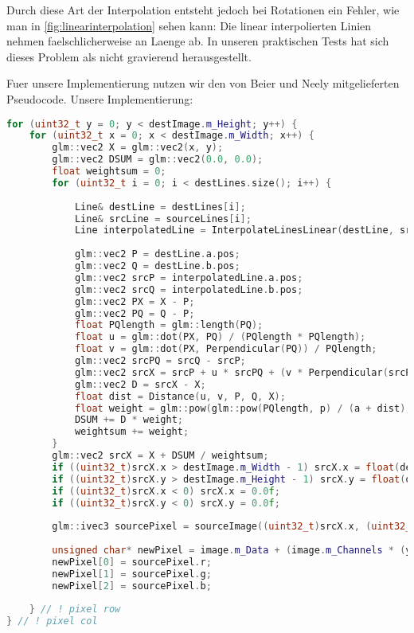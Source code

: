 
Durch diese Art der Interpolation entsteht jedoch bei
Rotationen ein Fehler, wie man in \ref{fig:linearinterpolation} sehen kann: Die linear
interpolierten Linien nehmen faelschlicherweise
an Laenge ab. In unseren praktischen Tests hat sich
dieses Problem als nicht gravierend herausgestellt.

Fuer unsere Implementierung nutzen wir den von Beier und Neely
mitgelieferten Pseudocode. Unsere Implementierung:

\begin{lstlisting}[language=C++, caption=Beier-Neely in C++, label=bncode, xleftmargin=0.5cm]
for (uint32_t y = 0; y < destImage.m_Height; y++) {
	for (uint32_t x = 0; x < destImage.m_Width; x++) {
		glm::vec2 X = glm::vec2(x, y);
		glm::vec2 DSUM = glm::vec2(0.0, 0.0);
		float weightsum = 0;     
		for (uint32_t i = 0; i < destLines.size(); i++) {
			
			Line& destLine = destLines[i];
			Line& srcLine = sourceLines[i];
			Line interpolatedLine = InterpolateLinesLinear(destLine, srcLine, pct);
			
			glm::vec2 P = destLine.a.pos;
			glm::vec2 Q = destLine.b.pos;
			glm::vec2 srcP = interpolatedLine.a.pos;
			glm::vec2 srcQ = interpolatedLine.b.pos;
			glm::vec2 PX = X - P;
			glm::vec2 PQ = Q - P;
			float PQlength = glm::length(PQ);
			float u = glm::dot(PX, PQ) / (PQlength * PQlength);
			float v = glm::dot(PX, Perpendicular(PQ)) / PQlength;
			glm::vec2 srcPQ = srcQ - srcP;
			glm::vec2 srcX = srcP + u * srcPQ + (v * Perpendicular(srcPQ) / glm::length(srcPQ));
			glm::vec2 D = srcX - X;
			float dist = Distance(u, v, P, Q, X);
			float weight = glm::pow(glm::pow(PQlength, p) / (a + dist), b);
			DSUM += D * weight;
			weightsum += weight;        
		}                
		glm::vec2 srcX = X + DSUM / weightsum;
		if ((uint32_t)srcX.x > destImage.m_Width - 1) srcX.x = float(destImage.m_Width - 1);
		if ((uint32_t)srcX.y > destImage.m_Height - 1) srcX.y = float(destImage.m_Height - 1);
		if ((uint32_t)srcX.x < 0) srcX.x = 0.0f;
		if ((uint32_t)srcX.y < 0) srcX.y = 0.0f;                
		
		glm::ivec3 sourcePixel = sourceImage((uint32_t)srcX.x, (uint32_t)srcX.y);                
		
		unsigned char* newPixel = image.m_Data + (image.m_Channels * (y * image.m_Width + x));
		newPixel[0] = sourcePixel.r;
		newPixel[1] = sourcePixel.g;
		newPixel[2] = sourcePixel.b;
		
	} // ! pixel row
} // ! pixel col    
\end{lstlisting}




